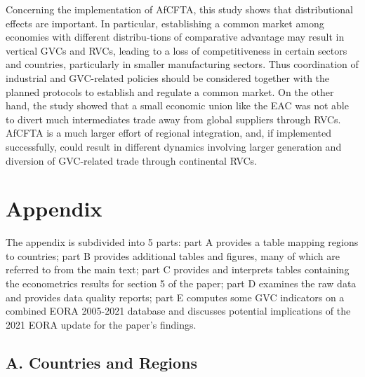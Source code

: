 \documentclass[a4paper]{article}
\begin{document}
Concerning the implementation of AfCFTA, this study shows that distributional effects are important. In particular, establishing a common market among economies with different distribu-tions of comparative advantage may result in vertical GVCs and RVCs, leading to a loss of competitiveness in certain sectors and countries, particularly in smaller manufacturing sectors. Thus coordination of industrial and GVC-related policies should be considered together with the planned protocols to establish and regulate a common market. On the other hand, the study showed that a small economic union like the EAC was not able to divert much intermediates trade away from global suppliers through RVCs. AfCFTA is a much larger effort of regional integration, and, if implemented successfully, could result in different dynamics involving larger generation and diversion of GVC-related trade through continental RVCs. 


\newpage




\newpage
\section*{Appendix}

The appendix is subdivided into 5 parts: part A provides a table mapping regions to countries; part B provides additional tables and figures, many of which are referred to from the main text; part C provides and interprets tables containing the econometrics results for section 5 of the paper; part D examines the raw data and provides data quality reports; part E computes some GVC indicators on a combined EORA 2005-2021 database and discusses potential implications of the 2021 EORA update for the paper's findings. 

\subsection*{A. Countries and Regions}
\setcounter{table}{0}
\renewcommand{\thetable}{A\arabic{table}}
\setcounter{figure}{0}
\renewcommand{\thefigure}{A\arabic{figure}}
\end{document}
